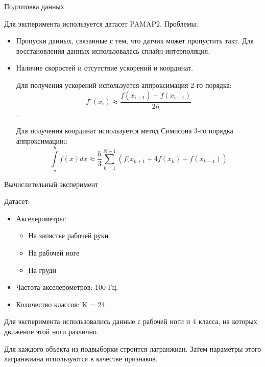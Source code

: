 \documentclass{beamer}
\begin{document}
\begin{frame}{Подготовка данных}

    Для эксперимента используется датасет PAMAP2. Проблемы:
    
        \begin{itemize}
    
            \item Пропуски данных, связанные с тем, что датчик может пропустить такт. Для восстановления данных использовалась сплайн-интерполяция.

            \item Наличие скоростей и отсутствие ускорений и координат.
            
            Для получения ускорений используется аппроксимация 2-го порядка:
            $$f'(x_i) \approx \frac{f(x_{i + 1}) - f(x_{i - 1})}{2h}$$.

            Для получения координат используется метод Симпсона 3-го порядка аппроксимации::
            $$\int\limits_a^b f(x) dx \approx \frac{h}{3} \sum\limits_{k = 1}^{N - 1} \left( f(x_{k + 1} + 4f(x_k) + f(x_{k - 1}) \right)$$

        \end{itemize}

\end{frame}


\begin{frame}{Вычислительный эксперимент}

    Датасет:
    
    \begin{itemize}

        \item Акселерометры:
            \begin{itemize}

                \item На запястье рабочей руки

                \item На рабочей ноге

                \item На груди

            \end{itemize}

        \item Частота акселерометров: 100 Гц.
            
        \item Количество классов: K = 24.

    \end{itemize}

    Для эксперимента использовались данные с рабочей ноги и 4 класса, на которых движение этой ноги различно.
        
    Для каждого объекта из подвыборки строится лагранжиан. Затем параметры этого лагранжиана используются в качестве признаков. 

\end{frame}
\end{document}
